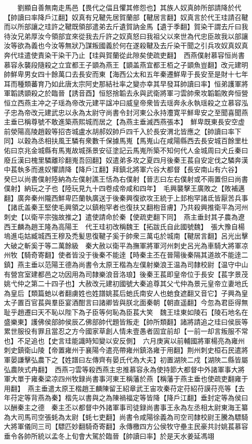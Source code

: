 　　劉顯自善無南走馬邑【畏代之偪且懼其修怨也】其族人奴真帥所部請降於代【帥讀曰率降戶江翻】奴真有兄鞬先居賀蘭部【鞬居言翻】奴真言於代王珪請召鞬而以所部讓之珪許之鞬既領部遣弟去斤遺賀訥金馬【遺于季翻】賀染干謂去斤曰我待汝兄弟厚汝今領部宜來從我去斤許之奴真怒曰我祖父以來世為代忠臣故我以部讓汝等欲為義也今汝等無狀乃謀叛國義於何在遂殺鞬及去斤染干聞之引兵攻奴真奴真奔代珪遣使責染干染干乃止【珪與賀蘭從此隙矣使疏吏翻】　西燕僕射慕容恒尚書慕容永襲段隨殺之立宜都王子顗為燕王【顗盖燕宜都王栢之子顗魚豈翻】改元建明帥鮮卑男女四十餘萬口去長安而東【海西公太和五年秦遷鮮卑于長安至是財十七年耳而種類蕃育乃如此唐太宗阿史那結社率之變亦幸其早發耳帥讀曰率】恒弟護軍將軍韜誘顗殺之於臨晉【誘音酉】恒怒捨韜去永與武衛將軍刁雲帥衆攻韜韜敗奔恒營恒立西燕主冲之子瑶為帝改元建平諡冲曰威皇帝衆皆去瑶奔永永執瑶殺之立慕容泓子忠為帝改元建武忠以永為太尉守尚書令封河東公永持灋寛平鮮卑安之至聞喜聞燕主垂已稱尊號不敢進築燕熙城而居之【為燕主垂滅西燕張本】　鮮卑既東長安空虚前滎陽高陵趙穀等招杏城盧水胡郝奴帥戶四千入於長安渭北皆應之【帥讀曰率下同】以穀為丞相扶風王驎有衆數千保據馬嵬【馬嵬山在咸陽縣西去長安城百餘里杜佑曰京兆金城縣有馬嵬故城孫景安征塗記云馬嵬所築不知何代人金城周曰犬丘秦曰廢丘漢曰槐里驎離珍翻嵬吾回翻】奴遣弟多攻之夏四月後秦王萇自安定伐之驎奔漢中萇執多而進奴懼請降【降戶江翻】拜鎮北將軍六谷大都督【長安南山有六谷】　癸巳以尚書僕射陸納為左僕射譙王恬為右僕射【晉志曰左右僕射或不兩置但曰尚書僕射】納玩之子也【陸玩見九十四卷成帝咸和四年】　毛興襲擊王廣敗之【敗補邁翻】廣奔秦州隴西鮮卑匹蘭執廣送于後秦興復欲攻王統于上邽枹罕諸氐皆厭苦兵事【諸氐盖秦王堅使毛興領之以鎮枹罕者也復扶又翻枹音膚】乃共殺興推衛平為河州刺史【以衛平宗強故推之】遣使請命於秦【使疏吏翻下同】　燕主垂封其子農為遼西王麟為趙王隆為高陽王　代王珪初改稱魏王【拓跋氏自此國號魏】　張大豫自楊塢進屯姑臧城西王穆及禿髪思復鞬子奚于帥衆三萬屯於城南【鞬居言翻】呂光出擊大破之斬奚于等二萬餘級　秦大赦以衛平為撫軍將軍河州刺史呂光為車騎大將軍凉州牧【騎奇寄翻】使者皆没于後秦不能逹【時秦主丕在晉陽後秦隔其道故不能逹二鎮】燕主垂以范陽王德為尚書令太原王楷為左僕射樂浪王温為司隸校尉【温守中山有營宫室建都邑之功因用為司隸樂浪音洛琅】後秦王萇即皇帝位于長安【萇字景茂姚弋仲之第二十四子也】大赦改元建初國號大秦追尊其父弋仲為景元皇帝立妻地氏為皇后【類篇虵以者翻虜姓也姓譜姚萇后虵氏南安人也虵食遮翻又音它】子興為皇太子置百官萇與羣臣宴酒酣言曰諸卿皆與朕北面秦朝【朝直遥翻】今忽為君臣得無耻乎趙遷曰天不恥以陛下為子臣等何恥為臣萇大笑　魏王珪東如陵石【陵石地名在盛樂東】護佛侯部帥侯辰乙佛部帥代題皆叛走【帥所類翻】諸將請追之珪曰侯辰等累世服役有罪且當忍之方今國家草創人情未壹愚者固宜前却【一前一却言叛服不常也】不足追也【史言珪能識時知變以安反側】　六月庚寅以前輔國將軍楊亮為雍州刺史鎮衛山陵【帝置雍州于襄陽今遣亮帶雍州鎮洛雍于用翻】荆州刺史桓石民遣將軍晏謙擊弘農下之【姓譜曰左傳齊有晏氏代為大夫】初置湖陜二戍【湖陜二縣皆屬弘農陜式冉翻】　西燕刁雲等殺西燕主忠推慕容永為使持節大都督中外諸軍事大將軍大單于雍秦梁凉四州牧録尚書事河東王稱藩於燕【稱藩于燕主垂也使疏吏翻雍于用翻】　燕主垂遣太原王楷趙王麟陳留王紹章武王宙攻秦苻定苻紹苻謨苻亮等【去年苻定等背燕為秦】楷先以書與之為陳禍福定等皆降【降戶江翻】垂封定等為侯曰以酬秦主之德　秦主丕以都督中外諸軍事司徒録尚書事王永為左丞相太尉東海王纂為大司馬司空張蚝為太尉【蚝七吏翻】尚書令咸陽徐義為司空司隸校尉王騰為驃騎大將軍儀同三司【驃匹妙翻騎奇寄翻】永傳檄四方公侯牧守壘主民豪共討姚萇慕容垂令各帥所統以孟冬上旬會大駕於臨晉【帥讀曰率】於是天水姜延馮翊